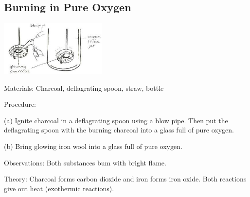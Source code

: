 \begin{multicols}{2}
\subsection{Burning in Pure Oxygen}

\begin{center}
\includegraphics[width=0.4\textwidth]{./img/source/burning-oxygen.jpg}
\end{center}

\begin{description*}
\item[Materials:]{Charcoal, deflagrating spoon, straw, bottle}
\item[Procedure:]{(a) Ignite charcoal in a deflagrating spoon
using a blow pipe. Then put the deflagrating
spoon with the burning charcoal into a glass full
of pure oxygen.

(b) Bring glowing iron wool into a glass full of
pure oxygen.}
\item[Observations:]{Both substances bum with bright flame.}
\item[Theory:]{Charcoal forms carbon dioxide and iron
forms iron oxide. Both reactions give out heat
(exothermic reactions).}
\end{description*}



\end{multicols}

\pagebreak